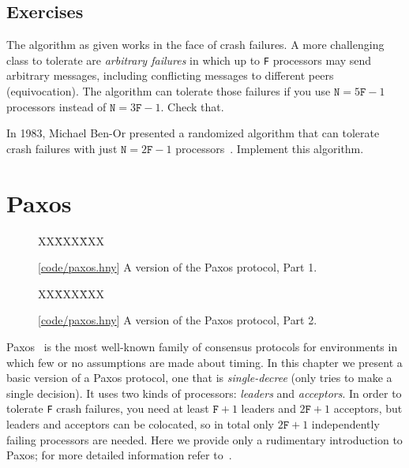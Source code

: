 \documentclass{report}
\newcommand{\harmonysource}[1]{
\begin{tabbing}
XX\=XXX\=XXX\kill
    
\end{tabbing}
}
\newcommand{\harmonylink}[1]{%
[\href{https://harmony.cs.cornell.edu/#1}{\underline{#1}}]%
}
\newenvironment{code}{
\tcolorbox
}{
\endtcolorbox
}
\begin{document}
\section*{Exercises}
\begin{problems}
\item The algorithm as given works in the face of crash failures.
A more challenging class to tolerate are \emph{arbitrary failures} in
which up to \texttt{F} processors may send arbitrary messages, including
conflicting messages to different peers (equivocation).
The algorithm can tolerate those failures if you use $\mathtt{N} = 5\mathtt{F} - 1$ processors instead of $\mathtt{N} = 3\mathtt{F} - 1$.  Check that.
\item In 1983, Michael Ben-Or presented a randomized algorithm that can
tolerate crash failures with
just $\mathtt{N} = 2\mathtt{F} - 1$ processors~\cite{BenOr83}.
Implement this algorithm.
\end{problems}

\chapter{Paxos}
\label{ch:paxos}

\begin{figure}
\begin{code}
\harmonysource{paxos1}
\end{code}
\caption{\harmonylink{code/paxos.hny} A version of the Paxos protocol, Part 1.}
\label{fig:paxos1}
\end{figure}

\begin{figure}
\begin{code}
\harmonysource{paxos2}
\end{code}
\caption{\harmonylink{code/paxos.hny} A version of the Paxos protocol, Part 2.}
\label{fig:paxos2}
\end{figure}

Paxos~\cite{Paxos} is the most well-known family of consensus protocols for
environments in which few or no assumptions are made about timing.
In this chapter we present a basic version of a Paxos protocol, one that is
\emph{single-decree} (only tries to make a single decision).
It uses two kinds of processors: \emph{leaders} and \emph{acceptors}.
In order to tolerate \texttt{F} crash failures, you need at least $\texttt{F}+1$ leaders
and $2\texttt{F} + 1$ acceptors, but leaders and acceptors can be colocated, so
in total only $2\texttt{F} + 1$ independently failing processors are needed.
Here we provide only a rudimentary introduction to Paxos; for more detailed
information refer to~\cite{Paxos}.
\end{document}
